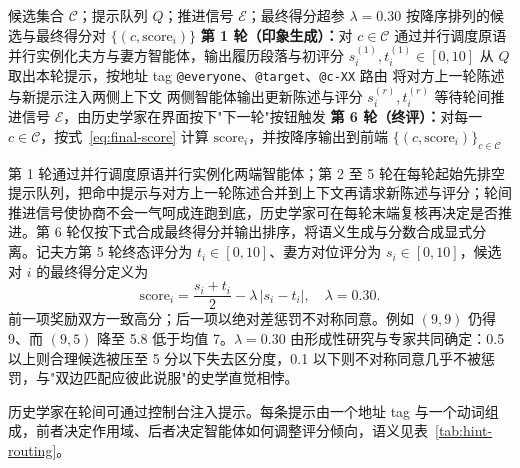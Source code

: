 \begin{algorithm}[t]
\caption{六轮多智能体协商：候选集合 \(\mathcal{C}\) 在队列年 \(t\) 的协商流程。}\label{alg:negotiation}
\begin{algorithmic}[1]
\Require 候选集合 \(\mathcal{C}\)；提示队列 \(Q\)；推进信号 \(\mathcal{E}\)；最终得分超参 \(\lambda=0.30\)
\Ensure 按降序排列的候选与最终得分对 \(\{(c, \mathrm{score}_i)\}\)
\State \textbf{第 1 轮（印象生成）：}对 \(c \in \mathcal{C}\) 通过并行调度原语并行实例化夫方与妻方智能体，输出履历段落与初评分 \(s_i^{(1)}, t_i^{(1)} \in [0,10]\)
  \State 从 \(Q\) 取出本轮提示，按地址 tag \texttt{@everyone}、\texttt{@target}、\texttt{@c-XX} 路由
  \State 将对方上一轮陈述与新提示注入两侧上下文
  \State 两侧智能体输出更新陈述与评分 \(s_i^{(r)}, t_i^{(r)}\)
  \State 等待轮间推进信号 \(\mathcal{E}\)，由历史学家在界面按下"下一轮"按钮触发
\EndFor
\State \textbf{第 6 轮（终评）：}对每一 \(c \in \mathcal{C}\)，按式~\eqref{eq:final-score} 计算 \(\mathrm{score}_i\)，并按降序输出到前端
\State \Return \(\{(c, \mathrm{score}_i)\}_{c \in \mathcal{C}}\)
\end{algorithmic}
\end{algorithm}

第 1 轮通过并行调度原语并行实例化两端智能体；第 2 至 5 轮在每轮起始先排空提示队列，把命中提示与对方上一轮陈述合并到上下文再请求新陈述与评分；轮间推进信号使协商不会一气呵成连跑到底，历史学家可在每轮末端复核再决定是否推进。第 6 轮仅按下式合成最终得分并输出排序，将语义生成与分数合成显式分离。记夫方第 5 轮终态评分为 \(t_i\in[0,10]\)、妻方对位评分为 \(s_i\in[0,10]\)，候选对 \(i\) 的最终得分定义为
\begin{equation}\label{eq:final-score}
  \mathrm{score}_i = \frac{s_i + t_i}{2} - \lambda\,|s_i - t_i|, \quad \lambda = 0.30.
\end{equation}
前一项奖励双方一致高分；后一项以绝对差惩罚不对称同意。例如 \((9,9)\) 仍得 9、而 \((9,5)\) 降至 5.8 低于均值 7。\(\lambda=0.30\) 由形成性研究与专家共同确定：0.5 以上则合理候选被压至 5 分以下失去区分度，0.1 以下则不对称同意几乎不被惩罚，与"双边匹配应彼此说服"的史学直觉相悖。

历史学家在轮间可通过控制台注入提示。每条提示由一个地址 tag 与一个动词组成，前者决定作用域、后者决定智能体如何调整评分倾向，语义见表~\ref{tab:hint-routing}。

